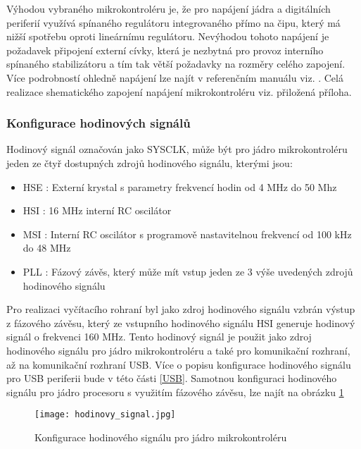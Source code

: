 	Výhodou vybraného mikrokontroléru je, že pro napájení jádra a digitálních periferií využívá spínaného regulátoru integrovaného přímo na čipu, který má nižší spotřebu oproti lineárnímu regulátoru. Nevýhodou tohoto napájení je požadavek připojení externí cívky, která je nezbytná pro provoz interního spínaného stabilizátoru a tím tak větší požadavky na rozměry celého zapojení. Více podrobností ohledně napájení lze najít v referenčním manuálu viz. \cite{STM32U5A9_RM}. Celá realizace shematického zapojení napájení mikrokontroléru viz. přiložená příloha. %
	
	\subsubsection{Konfigurace hodinových signálů} %
	Hodinový signál označován jako SYSCLK, může být pro jádro mikrokontroléru jeden ze čtyř dostupných zdrojů hodinového signálu, kterými jsou:
	\begin{itemize}
		\setlength\itemsep{0.005em}
		\item HSE : Externí krystal s parametry frekvencí hodin od 4 MHz do 50 Mhz
		\item HSI : 16 MHz interní RC oscilátor 
		\item MSI : Interní RC oscilátor s programově nastavitelnou frekvencí od 100 kHz do 48 MHz
		\item PLL : Fázový závěs, který může mít vstup jeden ze 3 výše uvedených zdrojů hodinového signálu
	\end{itemize}
	Pro realizaci vyčítacího rohraní byl jako zdroj hodinového signálu vzbrán výstup z fázového závěsu, který ze vstupního hodinového signálu HSI generuje hodinový signál o frekvenci 160 MHz. Tento hodinový signál je použit jako zdroj hodinového signálu pro jádro mikrokontroléru a také pro komunikační rozhraní, až na komunikační rozhraní USB. Více o popisu konfigurace hodinového signálu pro USB periferii bude v této části \ref{USB}. Samotnou konfiguraci hodinového signálu pro jádro procesoru s využitím fázového závěsu, lze najít na obrázku \ref{fig:hodinovy_signal}
	\begin{figure}[h!]
		\centering
		\captionsetup{justification=centering}
		\texttt{[image: hodinovy\_signal.jpg]}
		\caption{Konfigurace hodinového signálu pro jádro mikrokontroléru} 
		\label{fig:hodinovy_signal}
	\end{figure}

